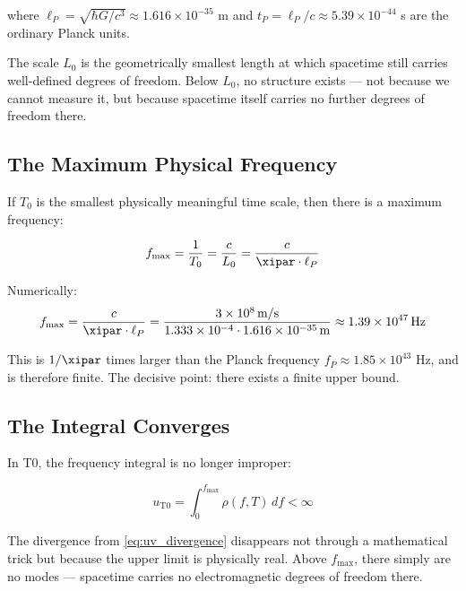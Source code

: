 where $\ell_P = \sqrt{\hbar G/c^3} \approx 1.616 \times 10^{-35}$ m and 
$t_P = \ell_P/c \approx 5.39 \times 10^{-44}$ s are the ordinary Planck units.

The scale $L_0$ is the geometrically smallest length at which spacetime still carries 
well-defined degrees of freedom. Below $L_0$, no structure exists — not because we 
cannot measure it, but because spacetime itself carries no further degrees of freedom 
there.

\subsection{The Maximum Physical Frequency}

If $T_0$ is the smallest physically meaningful time scale, then there is a maximum 
frequency:

\begin{equation}
    f_{\max} = \frac{1}{T_0} = \frac{c}{L_0} = \frac{c}{\xipar \cdot \ell_P}
    \label{eq:f_max}
\end{equation}

Numerically:
\begin{equation}
    f_{\max} = \frac{c}{\xipar \cdot \ell_P} 
    = \frac{3 \times 10^8 \, \text{m/s}}{1.333 \times 10^{-4} \cdot 1.616 \times 10^{-35} \, \text{m}}
    \approx 1.39 \times 10^{47} \, \text{Hz}
    \label{eq:f_max_numerical}
\end{equation}

This is $1/\xipar$ times larger than the Planck frequency $f_P \approx 1.85 \times 10^{43}$ Hz, 
and is therefore finite. The decisive point: there exists a finite upper bound.

\subsection{The Integral Converges}

In T0, the frequency integral is no longer improper:

\begin{equation}
    u_{\text{T0}} = \int_0^{f_{\max}} \rho(f, T) \, df < \infty
    \label{eq:t0_convergent_integral}
\end{equation}

The divergence from \eqref{eq:uv_divergence} disappears not through a mathematical 
trick but because the upper limit is physically real. Above $f_{\max}$, there simply 
are no modes — spacetime carries no electromagnetic degrees of freedom there.

